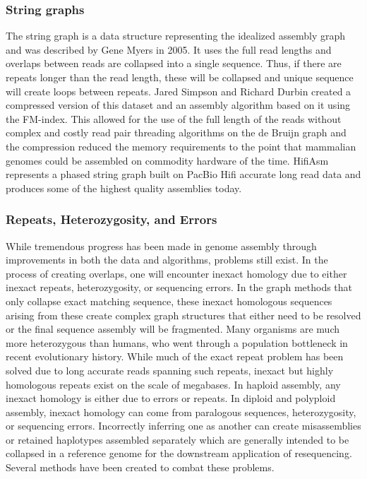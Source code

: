 \subsubsection{String graphs}

\par{
The string graph is a data structure representing the idealized assembly graph and was described by Gene Myers in 2005\cite{Myers2005}. It uses the full read lengths and overlaps between reads are collapsed into a single sequence. Thus, if there are repeats longer than the read length, these will be collapsed and unique sequence will create loops between repeats. Jared Simpson and Richard Durbin created a compressed version of this dataset and an assembly algorithm based on it using the FM-index\cite{fmindex2}\cite{fmindex}\cite{SGA}. This allowed for the use of the full length of the reads without complex and costly read pair threading algorithms on the de Bruijn graph and the compression reduced the memory requirements to the point that mammalian genomes could be assembled on commodity hardware of the time. HifiAsm represents a phased string graph built on PacBio Hifi accurate long read data\cite{hifiasm} and produces some of the highest quality assemblies today.
}


\subsubsection{Repeats, Heterozygosity, and Errors}

\par{
While tremendous progress has been made in genome assembly through improvements in both the data and algorithms, problems still exist. In the process of creating overlaps, one will encounter inexact homology due to either inexact repeats, heterozygosity, or sequencing errors. In the graph methods that only collapse exact matching sequence, these inexact homologous sequences arising from these create complex graph structures that either need to be resolved or the final sequence assembly will be fragmented\cite{assemblyissues}. Many organisms are much more heterozygous than humans, who went through a population bottleneck in recent evolutionary history\cite{bottleneck}. While much of the exact repeat problem has been solved due to long accurate reads spanning such repeats, inexact but highly homologous repeats exist on the scale of megabases\cite{segmentaldups}. In haploid assembly, any inexact homology is either due to errors or repeats. In diploid and polyploid assembly, inexact homology can come from paralogous sequences, heterozygosity, or sequencing errors. Incorrectly inferring one as another can create misassemblies or retained haplotypes assembled separately which are generally intended to be collapsed in a reference genome for the downstream application of resequencing. Several methods have been created to combat these problems.
}
